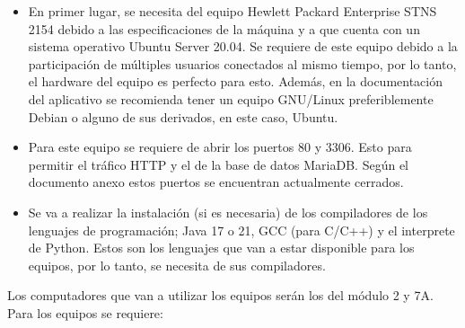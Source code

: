 \documentclass{article}
\begin{document}
\begin{itemize}
  \item En primer lugar, se necesita del equipo Hewlett Packard Enterprise STNS 2154 debido a las especificaciones de la máquina y a que cuenta con un sistema operativo Ubuntu Server 20.04. Se requiere de este equipo debido a la participación de múltiples usuarios conectados al mismo tiempo, por lo tanto, el hardware del equipo es perfecto para esto. Además, en la documentación del aplicativo se recomienda tener un equipo GNU/Linux preferiblemente Debian o alguno de sus derivados, en este caso, Ubuntu.
  \item Para este equipo se requiere de abrir los puertos \(80\) y \(3306\). Esto para permitir el tráfico HTTP y el de la base de datos MariaDB. Según el documento anexo estos puertos se encuentran actualmente cerrados.
  \item Se va a realizar la instalación (si es necesaria) de los compiladores de los lenguajes de programación; Java 17\cite{oracle-java} o 21, GCC\cite{gcc} (para C/C++) y el interprete de Python\cite{python-downloads}. Estos son los lenguajes que van a estar disponible para los equipos, por lo tanto, se necesita de sus compiladores.
\end{itemize}

Los computadores que van a utilizar los equipos serán los del módulo 2 y 7A. Para los equipos se requiere:
\end{document}

